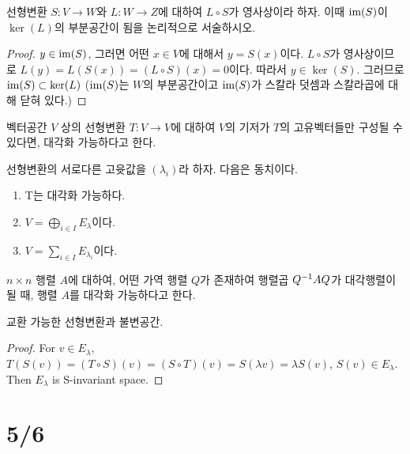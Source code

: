 \documentclass{article}
\begin{document}
\begin{proposition}
    선형변환 $S: V \to W$와 $L: W \to Z$에 대하여 $L \circ S$가 영사상이라 하자. 이때 $\operatorname{im}(S)$이 $\ker(L)$의 부분공간이 됨을 논리적으로 서술하시오.
\end{proposition}

\begin{proof}
    $y \in \operatorname{im}(S)$, 그러면 어떤 $x \in V$에 대해서 $y=S(x)$이다. $L \circ S$가 영사상이므로 $L(y)=L(S(x))=(L\circ S)(x)=0$이다. 따라서 $y \in \ker(S)$. 그러므로 $\operatorname{im}(S) \subset \ker(L)$ ($\operatorname{im}(S)$는 $W$의 부분공간이고 $\operatorname{im}(S)$가 스칼라 덧셈과 스칼라곱에 대해 닫혀 있다.)
\end{proof}

\begin{definition}
    벡터공간 $V$ 상의 선형변환 $T: V \to V$에 대하여 $V$의 기저가 $T$의 고유벡터들만 구성될 수 있다면, 대각화 가능하다고 한다.
\end{definition}

\begin{proposition}
    선형변환의 서로다른 고윳값을 $(\lambda_i)$라 하자. 다음은 동치이다.
    \begin{enumerate}
        \item T는 대각화 가능하다.
        \item $V=\bigoplus_{i \in I} E_\lambda$이다.
        \item $V=\sum_{i \in I} E_{\lambda_i}$이다.
    \end{enumerate}
\end{proposition}

\begin{definition}
    $n \times n$ 행렬 $A$에 대하여, 어떤 가역 행렬 $Q$가 존재하여 행렬곱 $Q^{-1} A Q$가 대각행렬이 될 때, 행렬 $A$를 대각화 가능하다고 한다.
\end{definition}

\begin{proposition}
    교환 가능한 선형변환과 불변공간.
\end{proposition}

\begin{proof}
    For $v \in E_\lambda$, $T(S(v))=(T\circ S)(v)=(S\circ T)(v)=S(\lambda v)=\lambda S(v)$, $S(v) \in E_\lambda$. Then $E_\lambda$ is S-invariant space.
\end{proof}

\section*{5/6}
\end{document}
